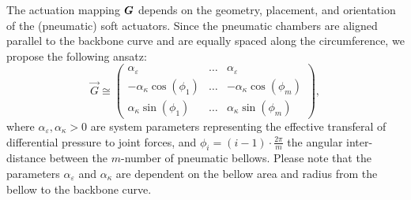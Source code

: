 The actuation mapping $\boldsymbol{G}$ depends on the geometry, placement, and orientation of the (pneumatic) soft actuators. Since the pneumatic chambers are aligned parallel to the backbone curve and are equally spaced along the circumference, we propose the following ansatz:
%
\begin{equation}
\vec{G} \cong \begin{pmatrix} \alpha_{\varepsilon} & \hdots & \alpha_{\varepsilon} \\ -\alpha_{\kappa} \cos(\phi_1) & \hdots & -\alpha_{\kappa} \cos(\phi_m) \\ \alpha_{\kappa} \sin(\phi_1) & \hdots & \alpha_{\kappa} \sin(\phi_m) \end{pmatrix},
\label{eq:C2:mapping_H}
\end{equation}
%
where $\alpha_{\varepsilon},\alpha_{\kappa} > 0$ are system parameters representing the effective transferal of differential pressure to joint forces, and $\phi_i = (i-1)\cdot\tfrac{2\pi}{m}$ the angular inter-distance between the $m$-number of pneumatic bellows. Please note that the parameters $\alpha_{\varepsilon}$ and $\alpha_{\kappa}$ are dependent on the bellow area and radius from the bellow to the backbone curve.
%
